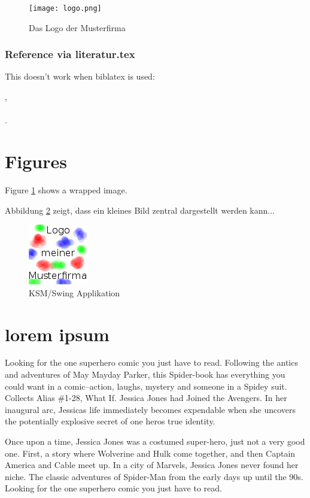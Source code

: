 \begin{figure}	%
\texttt{[image: logo.png]}
\caption{Das Logo der Musterfirma\footnotemark} %
\label{fig:logo-muster}
\end{figure}

\subsubsection{Reference via literatur.tex}
This doesn't work when biblatex is used:

\cite{bib:ix042010}, \cite{bib:metasploitBuch}
\paragraph{}
.

\section{Figures}
Figure \ref{fig:logo-muster} shows a wrapped image.

Abbildung \ref{fig:ksmswing-diagramm} zeigt, dass ein kleines Bild zentral dargestellt werden kann...

\begin{figure}[ht!]
\centering
\includegraphics{images/logo.png}
\caption{KSM/Swing Applikation \cite{mustermann:2012}}
\label{fig:ksmswing-diagramm}
\end{figure}


\section{lorem ipsum}
Looking for the one superhero comic you just have to read. Following the antics and adventures of May Mayday Parker, this Spider-book has everything you could want in a comic--action, laughs, mystery and someone in a Spidey suit. Collects Alias \#1-28, What If. Jessica Jones had Joined the Avengers. In her inaugural arc, Jessicas life immediately becomes expendable when she uncovers the potentially explosive secret of one heros true identity.

Once upon a time, Jessica Jones was a costumed super-hero, just not a very good one. First, a story where Wolverine and Hulk come together, and then Captain America and Cable meet up. In a city of Marvels, Jessica Jones never found her niche. The classic adventures of Spider-Man from the early days up until the 90s. Looking for the one superhero comic you just have to read.
